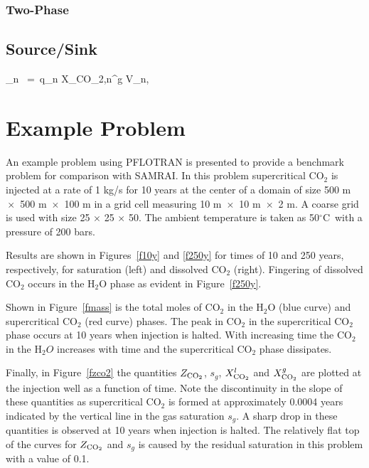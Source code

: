 \documentclass[12pt]{article}
\def\EQ#1\EN{\begin{equation}#1\end{equation}}
\newcommand{\eq}{\ =\ }
\newcommand{\degc}{$^\circ$C}
\renewcommand{\c}{{\rm CO_2}}
\begin{document}
\subsubsection{Two-Phase}

\subsection{Source/Sink}

\EQ
Q_n \eq q_n X_{\c,n}^g V_n,
\EN

\section{Example Problem}

An example problem using PFLOTRAN is presented to provide a benchmark problem for comparison with SAMRAI. In this problem supercritical CO$_2$ is injected at a rate of 1 kg/s for 10 years at the center of a domain of size 500 m $\!\times\!$ 500 m $\!\times\!$ 100 m in a grid cell measuring 10 m $\!\times\!$ 10 m $\!\times\!$ 2 m. A coarse grid is used with size 25 $\times$ 25 $\times$ 50. The ambient temperature is taken as 50\degc\ with a pressure of 200 bars.

Results are shown in Figures~\ref{f10y} and \ref{f250y} for times of 10 and 250 years, respectively, for saturation (left) and dissolved CO$_2$ (right). Fingering of dissolved CO$_2$ occurs in the H$_2$O phase as evident in Figure~\ref{f250y}.

Shown in Figure~\ref{fmass} is the total moles of CO$_2$ in the H$_2$O (blue curve) and supercritical CO$_2$ (red curve) phases. The peak in CO$_2$ in the supercritical CO$_2$ phase occurs at 10 years when injection is halted. With increasing time the CO$_2$ in the H$_2O$ increases with time and the supercritical CO$_2$ phase dissipates.

Finally, in Figure~\ref{fzco2} the quantities $Z_\c$, $s_g$, $X_\c^l$ and $X_\c^g$ are plotted at the injection well as a function of time. Note the discontinuity in the slope of these quantities as supercritical CO$_2$ is formed at approximately 0.0004 years indicated by the vertical line in the gas saturation $s_g$. A sharp drop in these quantities is observed at 10 years when injection is halted. The relatively flat top of the curves for $Z_\c$ and $s_g$ is caused by the residual saturation in this problem with a value of 0.1.
\end{document}
